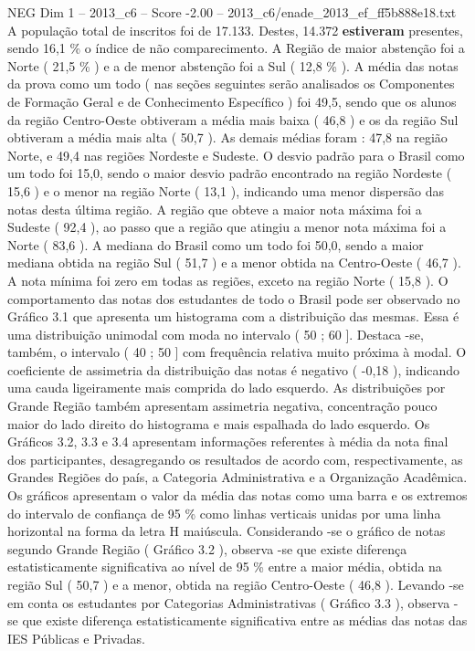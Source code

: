 \begin{textsample}{NEG Dim 1 – 2013\_c6 – Score -2.00 – 2013\_c6/enade\_2013\_ef\_ff5b888e18.txt}
A população total de inscritos foi de 17.133.
Destes, 14.372 \textbf{estiveram} presentes, sendo 16,1 \% o índice de não comparecimento.
A Região de maior abstenção foi a Norte ( 21,5 \% ) e a de menor abstenção foi a Sul ( 12,8 \% ).
A média das notas da prova como um todo ( nas seções seguintes serão analisados os Componentes de Formação Geral e de Conhecimento Específico ) foi 49,5, sendo que os alunos da região Centro-Oeste obtiveram a média mais baixa ( 46,8 ) e os da região Sul obtiveram a média mais alta ( 50,7 ).
As demais médias foram : 47,8 na região Norte, e 49,4 nas regiões Nordeste e Sudeste.
O desvio padrão para o Brasil como um todo foi 15,0, sendo o maior desvio padrão encontrado na região Nordeste ( 15,6 ) e o menor na região Norte ( 13,1 ), indicando uma menor dispersão das notas desta última região.
A região que obteve a maior nota máxima foi a Sudeste ( 92,4 ), ao passo que a região que atingiu a menor nota máxima foi a Norte ( 83,6 ).
A mediana do Brasil como um todo foi 50,0, sendo a maior mediana obtida na região Sul ( 51,7 ) e a menor obtida na Centro-Oeste ( 46,7 ).
A nota mínima foi zero em todas as regiões, exceto na região Norte ( 15,8 ).
O comportamento das notas dos estudantes de todo o Brasil pode ser observado no Gráfico 3.1 que apresenta um histograma com a distribuição das mesmas.
Essa é uma distribuição unimodal com moda no intervalo ( 50 ; 60 ].
Destaca -se, também, o intervalo ( 40 ; 50 ] com frequência relativa muito próxima à modal.
O coeficiente de assimetria da distribuição das notas é negativo ( -0,18 ), indicando uma cauda ligeiramente mais comprida do lado esquerdo.
As distribuições por Grande Região também apresentam assimetria negativa, concentração pouco maior do lado direito do histograma e mais espalhada do lado esquerdo.
Os Gráficos 3.2, 3.3 e 3.4 apresentam informações referentes à média da nota final dos participantes, desagregando os resultados de acordo com, respectivamente, as Grandes Regiões do país, a Categoria Administrativa e a Organização Acadêmica.
Os gráficos apresentam o valor da média das notas como uma barra e os extremos do intervalo de confiança de 95 \% como linhas verticais unidas por uma linha horizontal na forma da letra H maiúscula.
Considerando -se o gráfico de notas segundo Grande Região ( Gráfico 3.2 ), observa -se que existe diferença estatisticamente significativa ao nível de 95 \% entre a maior média, obtida na região Sul ( 50,7 ) e a menor, obtida na região Centro-Oeste ( 46,8 ).
Levando -se em conta os estudantes por Categorias Administrativas ( Gráfico 3.3 ), observa -se que existe diferença estatisticamente significativa entre as médias das notas das IES Públicas e Privadas.

\end{textsample}
